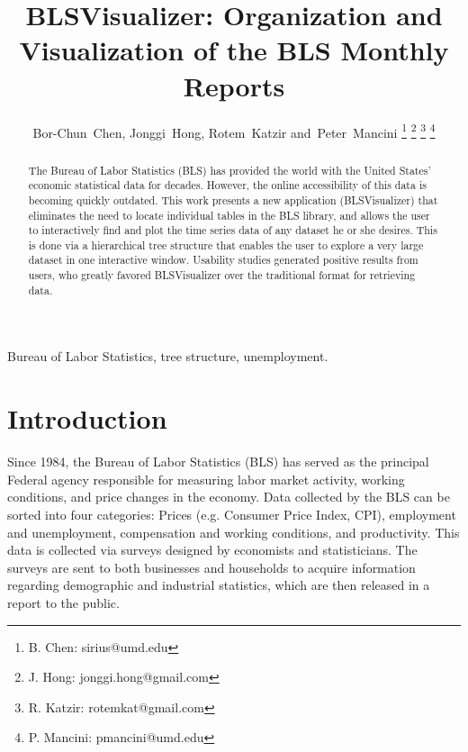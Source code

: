 \documentclass[journal]{IEEEtran}
\newcommand\Peter[1]{{\color{red}#1}}	%
\begin{document}
%
\title{BLSVisualizer: Organization and Visualization of the BLS Monthly Reports}

\author{Bor-Chun~Chen,
        Jonggi~Hong,
        Rotem~Katzir and~Peter~Mancini%
\thanks{B. Chen: sirius@umd.edu}%
\thanks{J. Hong: jonggi.hong@gmail.com}%
\thanks{R. Katzir: rotemkat@gmail.com}%
\thanks{P. Mancini: pmancini@umd.edu}}


\maketitle

\begin{abstract}

The Bureau of Labor Statistics (BLS) has provided the world with the United States' economic statistical data for decades. However, the online accessibility of this data is becoming quickly outdated. This work presents a new application (BLSVisualizer) that eliminates the need to locate individual tables in the BLS library, and allows the user to interactively find and plot the time series data of any dataset he or she desires. This is done via a hierarchical tree structure that enables the user to explore a very large dataset in one interactive window. Usability studies generated positive results from users, who greatly favored BLSVisualizer over the traditional format for retrieving data.  

\end{abstract}


\begin{IEEEkeywords}
Bureau of Labor Statistics, tree structure, unemployment.
\end{IEEEkeywords}


\maketitle

\section{Introduction}

\Peter{Since 1984, the Bureau of Labor Statistics (BLS) has served as the principal Federal agency responsible for measuring labor market activity, working conditions, and price changes in the economy. Data collected by the BLS can be sorted into four categories: Prices (e.g. Consumer Price Index, CPI), employment and unemployment, compensation and working conditions, and productivity. This data is collected via surveys designed by economists and statisticians. The surveys are sent to both businesses and households to acquire information regarding demographic and industrial statistics, which are then released in a report to the public.}
\end{document}
